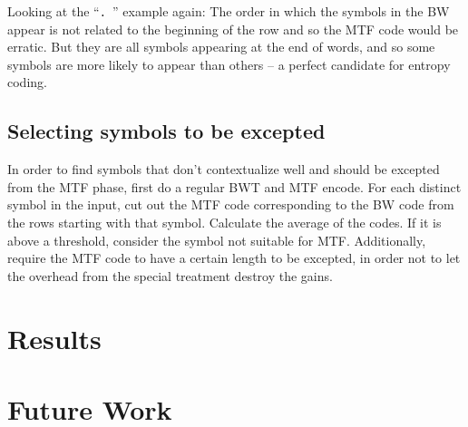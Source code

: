\documentclass[a4paper]{scrreprt}
\begin{document}
Looking at the ``\texttt{. }'' example again: The order in which the symbols in
the BW appear is not related to the beginning of the row and so the MTF code
would be erratic. But they are all symbols appearing at the end of words, and so
some symbols are more likely to appear than others -- a perfect candidate for
entropy coding.

\subsection{Selecting symbols to be excepted}

In order to find symbols that don't contextualize well and should be excepted
from the MTF phase, first do a regular BWT and MTF encode. For each distinct
symbol in the input, cut out the MTF code corresponding to the BW code from the
rows starting with that symbol. Calculate the average of the codes. If it is
above a threshold, consider the symbol not suitable for MTF. Additionally,
require the MTF code to have a certain length to be excepted, in order not to
let the overhead from the special treatment destroy the gains.

\section{Results}

\section{Future Work}




\end{document}
